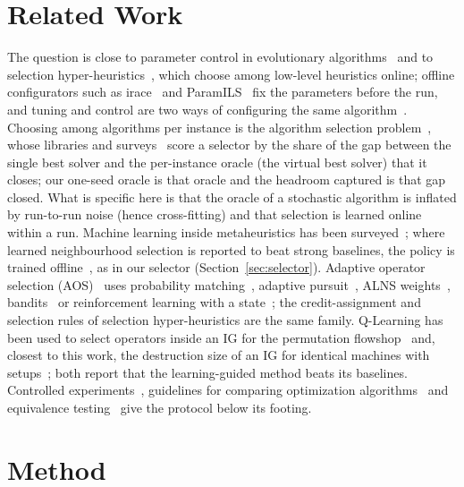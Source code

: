 \documentclass[conference,a4paper]{IEEEtran}
\begin{document}
\section{Related Work}
The question is close to parameter control in evolutionary algorithms~\cite{EibenEtal1999,KarafotiasEtal2015,AletiMoser2016} and to selection hyper-heuristics~\cite{BurkeEtal2013,DrakeEtal2020}, which choose among low-level heuristics online;
offline configurators such as irace~\cite{LopezIbanezEtal2016} and ParamILS~\cite{HutterEtal2009} fix the parameters before the run, and tuning and control are two ways of configuring the same algorithm~\cite{EibenSmit2011}.
Choosing among algorithms per instance is the algorithm selection problem~\cite{Rice1976}, whose libraries and surveys~\cite{BischlEtal2016,KerschkeEtal2019} score a selector by the share of the gap between the single best solver and the per-instance oracle (the virtual best solver) that it closes; our one-seed oracle is that oracle and the headroom captured is that gap closed. What is specific here is that the oracle of a stochastic algorithm is inflated by run-to-run noise (hence cross-fitting) and that selection is learned online within a run.
Machine learning inside metaheuristics has been surveyed~\cite{Talbi2021,KarimiMamaghanEtal2022}; where learned neighbourhood selection is reported to beat strong baselines, the policy is trained offline~\cite{SonneratEtal2021}, as in our selector (Section~\ref{sec:selector}).
Adaptive operator selection (AOS)~\cite{FialhoEtal2010} uses probability matching~\cite{Goldberg1990}, adaptive pursuit~\cite{Thierens2005}, ALNS weights~\cite{PisingerRopke2007}, bandits~\cite{AuerEtal2002,DaCostaEtal2008}
or reinforcement learning with a state~\cite{BengioBengio2021}; the credit-assignment and selection rules of selection hyper-heuristics are the same family. Q-Learning has been used to select operators inside an IG for the permutation flowshop~\cite{KarimiMamaghanEtal2023} and, closest to this work,
the destruction size of an IG for identical machines with setups~\cite{MissaouiOSullivan2026}; both report that the learning-guided method beats its baselines. Controlled experiments~\cite{Hooker1995}, guidelines for comparing
optimization algorithms~\cite{LaTorreEtal2021} and equivalence testing~\cite{Lakens2017} give the protocol below its footing.

\section{Method}
\end{document}
